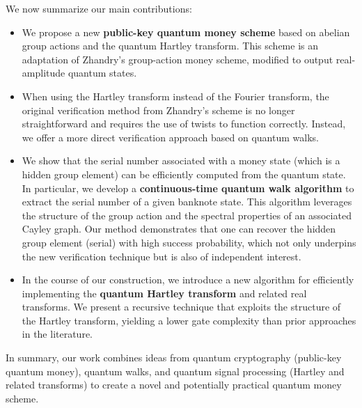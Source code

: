\documentclass[12pt]{report}
\begin{document}
We now summarize our main contributions:
\begin{itemize}
    \item We propose a new \textbf{public-key quantum money scheme} based on abelian group actions and the quantum Hartley transform. This scheme is an adaptation of Zhandry’s group-action money scheme, modified to output real-amplitude quantum states. 
    \item When using the Hartley transform instead of the Fourier transform, the original verification method from Zhandry’s scheme is no longer straightforward and requires the use of twists to function correctly. Instead, we offer a more direct verification approach based on quantum walks.
    \item We show that the serial number associated with a money state (which is a hidden group element) can be efficiently computed from the quantum state. In particular, we develop a \textbf{continuous-time quantum walk algorithm} to extract the serial number of a given banknote state. This algorithm leverages the structure of the group action and the spectral properties of an associated Cayley graph. Our method demonstrates that one can recover the hidden group element (serial) with high success probability, which not only underpins the new verification technique but is also of independent interest.
    \item In the course of our construction, we introduce a new algorithm for efficiently implementing the \textbf{quantum Hartley transform} and related real transforms. We present a recursive technique that exploits the structure of the Hartley transform, yielding a lower gate complexity than prior approaches in the literature.
\end{itemize}

In summary, our work combines ideas from quantum cryptography (public-key quantum money), quantum walks, and quantum signal processing (Hartley and related transforms) to create a novel and potentially practical quantum money scheme. 
\end{document}

